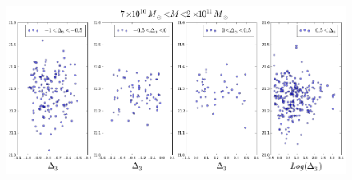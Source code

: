 \documentclass[12pt]{article}
\begin{document}
\begin{figure}[H]
\centering
\includegraphics[scale=0.4]{../figures/NHIvsD3.png}
\end{figure}
\end{document}
